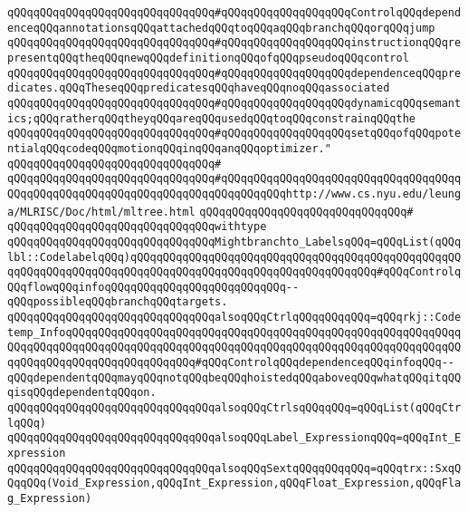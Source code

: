 \verb|qQQqqQQqqQQqqQQqqQQqqQQqqQQqqQQq#qQQqqQQqqQQqqQQqqQQqControlqQQqdependenceqQQqannotationsqQQqattachedqQQqtoqQQqaqQQqbranchqQQqorqQQqjump|\newline
\verb|qQQqqQQqqQQqqQQqqQQqqQQqqQQqqQQq#qQQqqQQqqQQqqQQqqQQqinstructionqQQqrepresentqQQqtheqQQqnewqQQqdefinitionqQQqofqQQqpseudoqQQqcontrol|\newline
\verb|qQQqqQQqqQQqqQQqqQQqqQQqqQQqqQQq#qQQqqQQqqQQqqQQqqQQqdependenceqQQqpredicates.qQQqTheseqQQqpredicatesqQQqhaveqQQqnoqQQqassociated|\newline
\verb|qQQqqQQqqQQqqQQqqQQqqQQqqQQqqQQq#qQQqqQQqqQQqqQQqqQQqdynamicqQQqsemantics;qQQqratherqQQqtheyqQQqareqQQqusedqQQqtoqQQqconstrainqQQqthe|\newline
\verb|qQQqqQQqqQQqqQQqqQQqqQQqqQQqqQQq#qQQqqQQqqQQqqQQqqQQqsetqQQqofqQQqpotentialqQQqcodeqQQqmotionqQQqinqQQqanqQQqoptimizer."|\newline
\verb|qQQqqQQqqQQqqQQqqQQqqQQqqQQqqQQq#|\newline
\verb|qQQqqQQqqQQqqQQqqQQqqQQqqQQqqQQq#qQQqqQQqqQQqqQQqqQQqqQQqqQQqqQQqqQQqqQQqqQQqqQQqqQQqqQQqqQQqqQQqqQQqqQQqqQQqqQQqhttp://www.cs.nyu.edu/leunga/MLRISC/Doc/html/mltree.html|\newline
\verb|qQQqqQQqqQQqqQQqqQQqqQQqqQQqqQQq#|\newline
\verb|qQQqqQQqqQQqqQQqqQQqqQQqqQQqqQQqwithtype|\newline
\verb|qQQqqQQqqQQqqQQqqQQqqQQqqQQqqQQqMightbranchto_LabelsqQQq=qQQqList(qQQqlbl::CodelabelqQQq)qQQqqQQqqQQqqQQqqQQqqQQqqQQqqQQqqQQqqQQqqQQqqQQqqQQqqQQqqQQqqQQqqQQqqQQqqQQqqQQqqQQqqQQqqQQqqQQqqQQqqQQqqQQq#qQQqControlqQQqflowqQQqinfoqQQqqQQqqQQqqQQqqQQqqQQqqQQq--qQQqpossibleqQQqbranchqQQqtargets.|\newline
\verb|qQQqqQQqqQQqqQQqqQQqqQQqqQQqqQQqalsoqQQqCtrlqQQqqQQqqQQq=qQQqrkj::Codetemp_InfoqQQqqQQqqQQqqQQqqQQqqQQqqQQqqQQqqQQqqQQqqQQqqQQqqQQqqQQqqQQqqQQqqQQqqQQqqQQqqQQqqQQqqQQqqQQqqQQqqQQqqQQqqQQqqQQqqQQqqQQqqQQqqQQqqQQqqQQqqQQqqQQqqQQqqQQqqQQqqQQq#qQQqControlqQQqdependenceqQQqinfoqQQq--qQQqdependentqQQqmayqQQqnotqQQqbeqQQqhoistedqQQqaboveqQQqwhatqQQqitqQQqisqQQqdependentqQQqon.|\newline
\verb|qQQqqQQqqQQqqQQqqQQqqQQqqQQqqQQqalsoqQQqCtrlsqQQqqQQq=qQQqList(qQQqCtrlqQQq)|\newline
\newline
\verb|qQQqqQQqqQQqqQQqqQQqqQQqqQQqqQQqalsoqQQqLabel_ExpressionqQQq=qQQqInt_Expression|\newline
\newline
\verb|qQQqqQQqqQQqqQQqqQQqqQQqqQQqqQQqalsoqQQqSextqQQqqQQqqQQq=qQQqtrx::SxqQQqqQQq(Void_Expression,qQQqInt_Expression,qQQqFloat_Expression,qQQqFlag_Expression)|\newline
